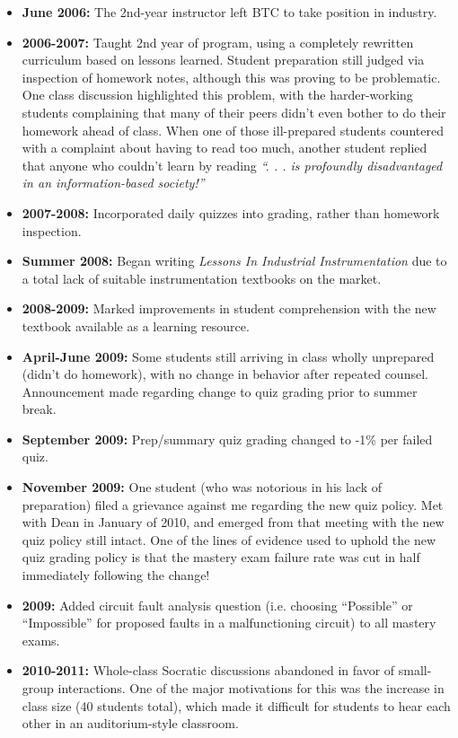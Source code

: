 \begin{itemize}
\vskip 10pt
\item{} {\bf June 2006:} The 2nd-year instructor left BTC to take position in industry.
\vskip 10pt
\item{} {\bf 2006-2007:} Taught 2nd year of program, using a completely rewritten curriculum based on lessons learned.  Student preparation still judged via inspection of homework notes, although this was proving to be problematic.  One class discussion highlighted this problem, with the harder-working students complaining that many of their peers didn't even bother to do their homework ahead of class.  When one of those ill-prepared students countered with a complaint about having to read too much, another student replied that anyone who couldn't learn by reading {\it ``. . . is profoundly disadvantaged in an information-based society!''}
\vskip 10pt
\item{} {\bf 2007-2008:} Incorporated daily quizzes into grading, rather than homework inspection.
\vskip 10pt
\item{} {\bf Summer 2008:} Began writing {\it Lessons In Industrial Instrumentation} due to a total lack of suitable instrumentation textbooks on the market.
\vskip 10pt
\item{} {\bf 2008-2009:} Marked improvements in student comprehension with the new textbook available as a learning resource.
\vskip 10pt
\item{} {\bf April-June 2009:} Some students still arriving in class wholly unprepared (didn't do homework), with no change in behavior after repeated counsel.  Announcement made regarding change to quiz grading prior to summer break.
\vskip 10pt
\item{} {\bf September 2009:} Prep/summary quiz grading changed to -1\% per failed quiz.
\vskip 10pt
\item{} {\bf November 2009:} One student (who was notorious in his lack of preparation) filed a grievance against me regarding the new quiz policy.  Met with Dean in January of 2010, and emerged from that meeting with the new quiz policy still intact.  One of the lines of evidence used to uphold the new quiz grading policy is that the mastery exam failure rate was cut in half immediately following the change!
\vskip 10pt
\item{} {\bf 2009:} Added circuit fault analysis question (i.e. choosing ``Possible'' or ``Impossible'' for proposed faults in a malfunctioning circuit) to all mastery exams.
\vskip 10pt
\item{} {\bf 2010-2011:} Whole-class Socratic discussions abandoned in favor of small-group interactions.  One of the major motivations for this was the increase in class size (40 students total), which made it difficult for students to hear each other in an auditorium-style classroom.

\end{itemize}
